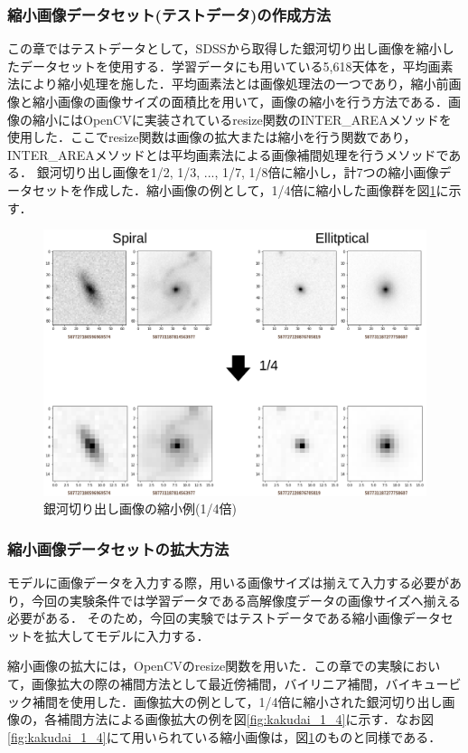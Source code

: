 \documentclass[a4j, 11pt]{jreport}
\begin{document}
\subsubsection{縮小画像データセット(テストデータ)の作成方法}
この章ではテストデータとして，SDSSから取得した銀河切り出し画像を縮小したデータセットを使用する．学習データにも用いている5,618天体を，平均画素法により縮小処理を施した．平均画素法とは画像処理法の一つであり，縮小前画像と縮小画像の画像サイズの面積比を用いて，画像の縮小を行う方法である．画像の縮小にはOpenCVに実装されているresize関数のINTER\_AREAメソッドを使用した．ここでresize関数は画像の拡大または縮小を行う関数であり，INTER\_AREAメソッドとは平均画素法による画像補間処理を行うメソッドである．
銀河切り出し画像を1/2, 1/3, ..., 1/7, 1/8倍に縮小し，計7つの縮小画像データセットを作成した．縮小画像の例として，1/4倍に縮小した画像群を図\ref{fig:shrink_1_4}に示す．

\begin{figure}
 \centering
 \includegraphics[width=13cm]{images/5syou/syuron_5syou_kakudai/ver1/5syou_shrink_ver1.png}
 \caption{銀河切り出し画像の縮小例(1/4倍)}
 \label{fig:shrink_1_4}
\end{figure}

\subsubsection{縮小画像データセットの拡大方法}
モデルに画像データを入力する際，用いる画像サイズは揃えて入力する必要があり，今回の実験条件では学習データである高解像度データの画像サイズへ揃える必要がある．
そのため，今回の実験ではテストデータである縮小画像データセットを拡大してモデルに入力する．

縮小画像の拡大には，OpenCVのresize関数を用いた．この章での実験において，画像拡大の際の補間方法として最近傍補間，バイリニア補間，バイキュービック補間を使用した．画像拡大の例として，1/4倍に縮小された銀河切り出し画像の，各補間方法による画像拡大の例を図\ref{fig:kakudai_1_4}に示す．なお図\ref{fig:kakudai_1_4}にて用いられている縮小画像は，図\ref{fig:shrink_1_4}のものと同様である．
\end{document}
